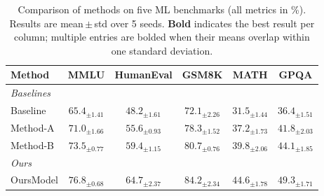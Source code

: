 \documentclass[10pt]{article}
\begin{document}
\pagestyle{empty}
\begin{table}[!ht]
\centering
\small
\begin{tabular}{lccccc}
\toprule
\textbf{Method} & \textbf{MMLU} & \textbf{HumanEval} & \textbf{GSM8K} & \textbf{MATH} & \textbf{GPQA} \\
\midrule
\multicolumn{6}{l}{\textit{Baselines}} \\
Baseline & $65.4_{\pm 1.41}$ & $48.2_{\pm 1.61}$ & $72.1_{\pm 2.26}$ & $31.5_{\pm 1.44}$ & $36.4_{\pm 1.51}$ \\
Method-A & $71.0_{\pm 1.66}$ & $55.6_{\pm 0.93}$ & $78.3_{\pm 1.52}$ & $37.2_{\pm 1.73}$ & $41.8_{\pm 2.03}$ \\
Method-B & $73.5_{\pm 0.77}$ & $59.4_{\pm 1.15}$ & $80.7_{\pm 0.76}$ & $39.8_{\pm 2.06}$ & $44.1_{\pm 1.85}$ \\
\midrule
\multicolumn{6}{l}{\textit{Ours}} \\
OursModel & \textbf{$76.8_{\pm 0.68}$} & \textbf{$64.7_{\pm 2.37}$} & \textbf{$84.2_{\pm 2.34}$} & \textbf{$44.6_{\pm 1.78}$} & \textbf{$49.3_{\pm 1.71}$} \\
\bottomrule
\end{tabular}
\caption{Comparison of methods on five ML benchmarks (all metrics in \%). Results are mean\,$\pm$\,std over 5 seeds. \textbf{Bold} indicates the best result per column; multiple entries are bolded when their means overlap within one standard deviation.}
\end{table}
\end{document}
